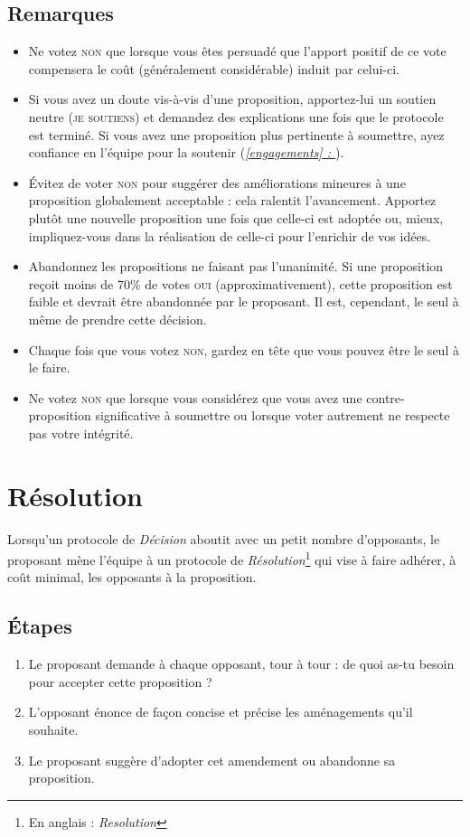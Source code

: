 \documentclass[paper=6in:9in,pagesize=pdftex,headinclude=on,footinclude=on,12pt]{scrbook}
\newcommand*{\fullref}[1]{\textit{\hyperref[{#1}]{\autoref*{#1} : \nameref*{#1}}}}
\begin{document}
\subsection{Remarques}
\begin{itemize}
	\item Ne votez \textsc{non} que lorsque vous êtes persuadé que l'apport positif de ce vote compensera le coût (généralement considérable) induit par celui-ci.
	\item Si vous avez un doute vis-à-vis d'une proposition, ap\-portez-lui un soutien neutre (\textsc{je soutiens}) et demandez des explications une fois que le
	      protocole est terminé. Si vous avez une proposition plus pertinente à soumettre, ayez confiance en l'équipe pour la soutenir (\fullref{engagements}).
	\item Évitez de voter \textsc{non} pour suggérer des améliorations mineures à une proposition globalement acceptable : cela ralentit l'avancement. Apportez
	      plutôt une nouvelle proposition une fois que celle-ci est adoptée ou, mieux, impliquez-vous dans la réalisation de celle-ci pour l'enrichir de vos idées.
	\item Abandonnez les propositions ne faisant pas l'unanimité. Si une proposition reçoit moins de 70\% de votes \textsc{oui} (approximativement), cette proposition
	      est faible et devrait être abandonnée par le proposant. Il est, cependant, le seul à même de prendre cette décision.
	\item Chaque fois que vous votez \textsc{non}, gardez en tête que vous pouvez être le seul à le faire.
	\item Ne votez \textsc{non} que lorsque vous considérez que vous avez une contre-proposition significative à soumettre ou lorsque voter autrement ne respecte pas
	      votre intégrité.
\end{itemize}

\section{Résolution} \label{protocole-resolution}

Lorsqu'un protocole de \emph{Décision} aboutit avec un petit nombre d'opposants, le proposant mène l'équipe à un protocole de
\emph{Résolution}\footnote{En anglais : \emph{Resolution}} qui vise à faire adhérer,
à coût minimal, les opposants à la proposition.

\subsection{Étapes}
\begin{enumerate}
	\item Le proposant demande à chaque opposant, tour à tour : \og{}de quoi as-tu besoin pour accepter cette proposition ?\fg{}
	\item L'opposant énonce de façon concise et précise les aménagements qu'il souhaite.
	\item Le proposant suggère d'adopter cet amendement ou abandonne sa proposition.
\end{enumerate}
\end{document}
